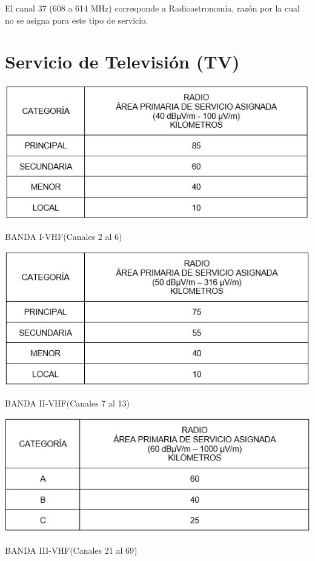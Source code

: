 El canal 37 (608 a 614 MHz) corresponde a Radioastronomía, razón por la cual no se asigna para este tipo de servicio.
\newpage
\section{Servicio de Televisión (TV)}

\begin{table}[ht]
    \begin{center}
        \includegraphics{contenido/img/ej7tab1.JPG}
        \caption{BANDA I-VHF(Canales 2 al 6)}
    \end{center}
\end{table}

\begin{table}[ht]
    \begin{center}
        \includegraphics{contenido/img/ej7tab2.JPG}
        \caption{BANDA II-VHF(Canales 7 al 13)}
    \end{center}
\end{table}

\begin{table}[ht]
    \begin{center}
        \includegraphics{contenido/img/ej7tab3.JPG}
        \caption{BANDA III-VHF(Canales 21 al 69)}
    \end{center}
\end{table}

